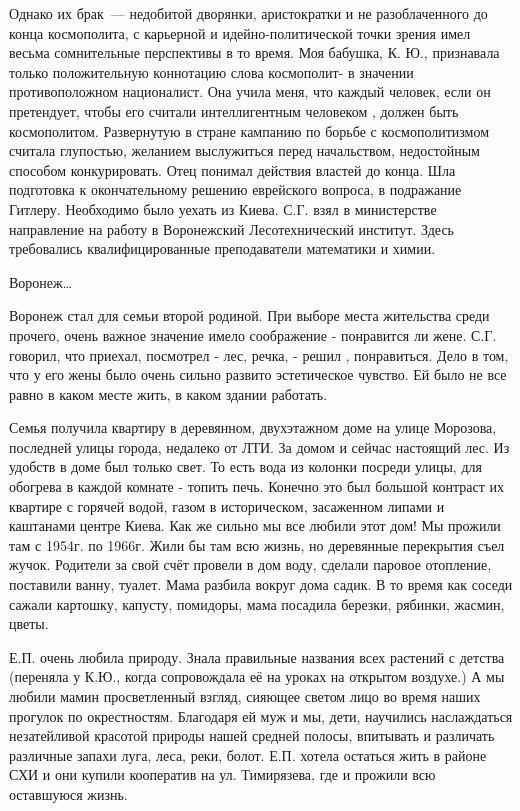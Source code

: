 Однако их брак~--- недобитой дворянки, аристократки и не разоблаченного до конца космополита,
с карьерной и идейно-полити\-ческой точки зрения имел весьма сомнительные перспективы в то время.
Моя бабушка, К. Ю., признавала только положительную коннотацию слова космополит- в значении противоположном националист. Она учила меня, что каждый человек, если он претендует, чтобы его считали интеллигентным человеком , должен быть космополитом. Развернутую в стране кампанию по борьбе с космополитизмом считала глупостью, желанием выслужиться перед начальством, недостойным способом конкурировать. Отец понимал действия властей до конца. Шла подготовка к окончательному решению еврейского вопроса, в подражание Гитлеру. Необходимо было уехать из Киева. С.Г. взял в министерстве направление на работу в Воронежский Лесотехнический институт. Здесь требовались квалифицированные преподаватели математики и химии.

Воронеж…

Воронеж стал для семьи второй родиной. При выборе места жительства среди прочего, очень важное значение имело соображение - понравится ли жене. С.Г. говорил, что приехал, посмотрел - лес, речка, - решил , понравиться. Дело в том, что у его жены было очень сильно развито эстетическое чувство. Ей было не все равно в каком месте жить, в каком здании работать.

Семья получила квартиру в деревянном, двухэтажном доме на улице Морозова, последней улицы города, недалеко от ЛТИ. За домом и сейчас настоящий лес. Из удобств в доме был только свет. То есть вода из колонки посреди улицы, для обогрева в каждой комнате - топить печь. Конечно это был большой контраст их квартире с горячей водой, газом в историческом, засаженном липами и каштанами центре Киева.
Как же сильно мы все любили этот дом! Мы прожили там с 1954г. по 1966г. Жили бы там всю жизнь, но деревянные перекрытия съел жучок. Родители за свой счёт провели в дом воду, сделали паровое отопление, поставили ванну, туалет. Мама разбила вокруг дома садик. В то время как соседи сажали картошку, капусту, помидоры, мама посадила березки, рябинки, жасмин, цветы.

Е.П. очень любила природу. Знала правильные названия всех растений с детства (переняла у К.Ю., когда сопровождала её на уроках на открытом воздухе.) А мы любили мамин просветленный взгляд, сияющее светом лицо во время наших прогулок по окрестностям. Благодаря ей муж и мы, дети, научились наслаждаться незатейливой красотой природы нашей средней полосы, впитывать и различать различные запахи луга, леса, реки, болот.
Е.П. хотела остаться жить в районе СХИ и они купили кооператив на ул. Тимирязева, где и прожили всю оставшуюся жизнь.

